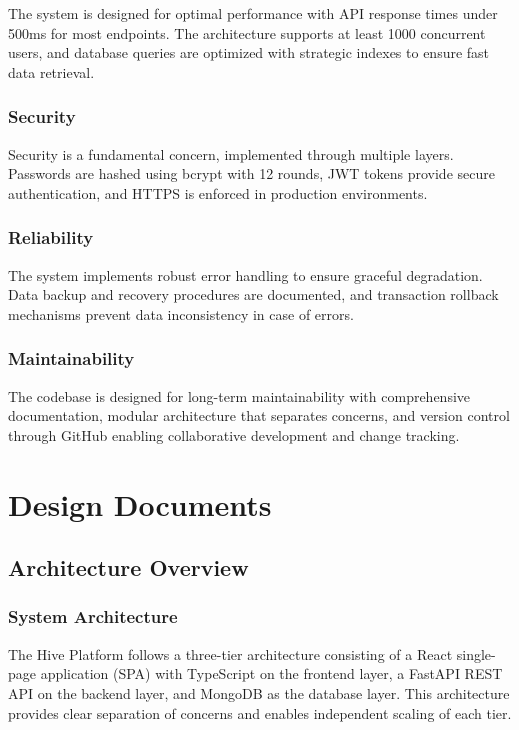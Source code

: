 \documentclass[12pt,a4paper]{report}
\begin{document}
The system is designed for optimal performance with API response times under 500ms for most endpoints. The architecture supports at least 1000 concurrent users, and database queries are optimized with strategic indexes to ensure fast data retrieval.

\subsection{Security}

Security is a fundamental concern, implemented through multiple layers. Passwords are hashed using bcrypt with 12 rounds, JWT tokens provide secure authentication, and HTTPS is enforced in production environments.

\subsection{Reliability}

The system implements robust error handling to ensure graceful degradation. Data backup and recovery procedures are documented, and transaction rollback mechanisms prevent data inconsistency in case of errors.

\subsection{Maintainability}

The codebase is designed for long-term maintainability with comprehensive documentation, modular architecture that separates concerns, and version control through GitHub enabling collaborative development and change tracking.

\chapter{Design Documents}

\section{Architecture Overview}

\subsection{System Architecture}

The Hive Platform follows a three-tier architecture consisting of a React single-page application (SPA) with TypeScript on the frontend layer, a FastAPI REST API on the backend layer, and MongoDB as the database layer. This architecture provides clear separation of concerns and enables independent scaling of each tier.
\end{document}
